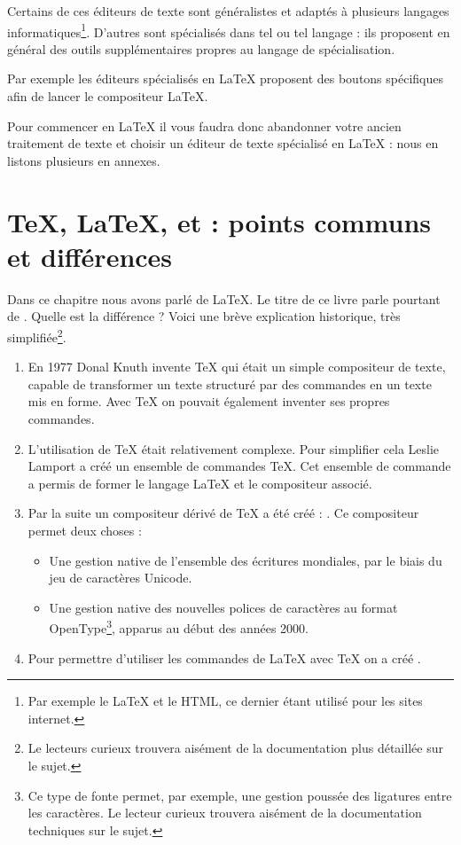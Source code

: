 Certains de ces éditeurs de texte sont généralistes et adaptés à plusieurs langages informatiques\footnote{Par exemple le \LaTeX{} et le HTML, ce dernier étant utilisé pour les sites internet.}. D'autres sont spécialisés dans tel ou tel langage : ils proposent en général des outils supplémentaires propres au langage de spécialisation. 

Par exemple les éditeurs spécialisés en \LaTeX{} proposent des boutons spécifiques afin de lancer le compositeur \LaTeX{}.

Pour commencer en \LaTeX{} il vous faudra donc abandonner votre ancien traitement de texte et choisir un éditeur de texte spécialisé en \LaTeX{} : nous en listons plusieurs en annexes.

\section[TeX, LaTeX, XeTeX, XeLaTeX : points communs et différences]{\TeX{}, \LaTeX{}, \XeTeX{} et \XeLaTeX{} : points communs et différences}\label{TeXLaTeX}

Dans ce chapitre nous avons parlé de \LaTeX{}. Le titre de ce livre parle pourtant  de \XeLaTeX{}. Quelle est la différence ? Voici une brève explication historique, très simplifiée\footnote{Le lecteurs curieux trouvera aisément de la documentation plus détaillée sur le sujet.}.

\begin{enumerate}
\item En 1977 Donal Knuth invente  \TeX{} qui était un simple compositeur de texte, capable de transformer un texte structuré par des commandes en un texte mis en forme. Avec \TeX{} on pouvait également inventer ses propres commandes.
\item L'utilisation de \TeX{} était relativement complexe. Pour simplifier cela Leslie Lamport a créé un ensemble de commandes \TeX{}. Cet ensemble de commande a permis de former le langage \LaTeX{} et le compositeur associé.
\item Par la suite un compositeur dérivé de \TeX{} a été créé : \XeTeX{}. Ce compositeur permet deux choses :
\begin{itemize}
	\item Une gestion native de l'ensemble des écritures mondiales, par le biais du jeu de caractères Unicode.
	\item Une gestion native des nouvelles polices de caractères au format OpenType\footnote{Ce type de fonte permet, par exemple, une gestion poussée des ligatures entre les caractères. Le lecteur curieux trouvera aisément de la documentation techniques sur le sujet.}, apparus au début des années 2000.

\end{itemize} 
\item Pour permettre d'utiliser les commandes de \LaTeX{} avec \TeX{} on a créé \XeLaTeX{}.
\end{enumerate}

